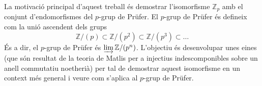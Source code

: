 La motivació principal d'aquest treball és demostrar l'isomorfisme $\mathbb{Z}_{p}$ amb el conjunt d'endomorfismes del $p$-grup de Prüfer. El $p$-grup de Prüfer és defineix com la unió ascendent dels grups
\begin{equation*}
    \mathbb{Z}/(p)
    \subset\mathbb{Z}/(p^{2})
    \subset\mathbb{Z}/(p^{3})
    \subset\ldots
\end{equation*}
És a dir, el $p$-grup de Prüfer és $\varinjlim\mathbb{Z}/(p^{n})$. L'objectiu és desenvolupar unes eines (que són resultat de la teoria de Matlis per a injectius indescomponibles sobre un anell commutatiu noetherià) per tal de demostrar aquest isomorfisme en un context més general i veure com s'aplica al $p$-grup de Prüfer.